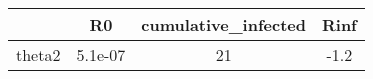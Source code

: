 \begin{tabular}{|c|c|c|c|}
\hline
& R0 & cumulative_infected & Rinf \\
\hline
theta2 & 5.1e-07 & 21 & -1.2 \\
\hline
\end{tabular}
